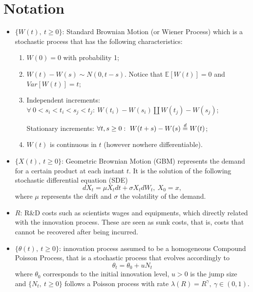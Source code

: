 \chapter*{Notation}



\begin{itemize}
	\item $\{ W(t), \ t \geq 0 \}$: Standard Brownian Motion (or Wiener Process) which is a stochastic process that has the following characteristics:
	\begin{enumerate}
		\item $W(0) = 0$ with probability 1;
		\item $W(t) - W(s) \sim N(0, t-s)$. Notice that $\mathds{E}[W(t)] = 0$ and $Var[W(t)] = t$;
		\item Independent increments: $\forall \ 0 < s_i < t_i < s_j < t_j: \ W(t_i) - W(s_i) \amalg W(t_j) - W(s_j) $;
		
		Stationary increments:  $\forall t,s \geq 0: \ W(t+s) - W(s) \buildrel d\over= W(t) $;
		\item $W(t)$ is continuous in $t$ (however nowhere differentiable).
	\end{enumerate}

	\item  $\{ X(t), \ t \geq 0 \}$: Geometric Brownian Motion (GBM) represents the demand for a certain product at each instant $t$. It is the solution of the following stochastic differential equation (SDE)
	$$ dX_t=\mu X_t dt + \sigma X_t d W_t, \ X_0=x, $$
	where $\mu$ represents the drift and $\sigma$ the volatility of the demand.
	
	\item $R$: R\&D costs such as scientists wages and equipments, which directly related with the innovation process. These are seen as sunk costs, that is, costs that cannot be recovered after being incurred.
	
	\item  $\{ \theta(t), \ t \geq 0 \}$: innovation process assumed to be a homogeneous Compound Poisson Process, that is a stochastic process that evolves accordingly to
	$$\theta_t= \theta_0+ u N_t$$
	where $\theta_0$ corresponds to the initial innovation level, $u > 0$ is the jump size and $\{N_t, \ t \geq 0\}$ follows a Poisson process with rate $\lambda(R)=R^\gamma, \ \gamma \in (0,1)$.
	

\end{itemize}
